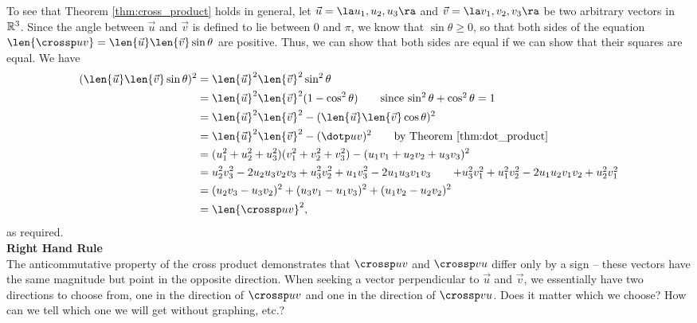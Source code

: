 To see that Theorem \ref{thm:cross_product} holds in general, let $\vec u=\la u_1,u_2,u_3\ra$ and $\vec v =\la v_1,v_2,v_3\ra$ be two arbitrary vectors in $\mathbb{R}^3$. Since the angle between $\vec u$ and $\vec v$ is defined to lie between 0 and $\pi$, we know that $\sin\theta\geq 0$, so that both sides of the equation $\len{\crossp uv} = \len{\vec{u}}\len{\vec v}\sin\theta$ are positive. Thus, we can show that both sides are equal if we can show that their squares are equal. We have
\begin{align*}
(\len{\vec u}\len{\vec v}\sin\theta)^2 & = \len{\vec u}^2\len{\vec v}^2\sin^2\theta\\
& = \len{\vec u}^2\len{\vec v}^2(1-\cos^2\theta) \tag*{since $\sin^2\theta+\cos^2\theta=1$}\\
& = \len{\vec u}^2\len{\vec v}^2-(\len{\vec u}\len{\vec v}\cos\theta)^2\\
& = \len{\vec u}^2\len{\vec v}^2-(\dotp uv)^2 \tag*{by Theorem \ref{thm:dot_product}}\\
& = (u_1^2+u_2^2+u_3^2)(v_1^2+v_2^2+v_3^2)-(u_1v_1+u_2v_2+u_3v_3)^2\\
& = u_2^2v_3^2 - 2u_2u_3v_2v_3 + u_3^2v_2^2 + u_1v_3^2 - 2u_1u_3v_1v_3 \tag*{$+ u_3^2v_1^2 + u_1^2v_2^2 - 2u_1u_2v_1v_2 + u_2^2v_1^2$}\\
& = (u_2v_3-u_3v_2)^2+(u_3v_1-u_1v_3)^2+(u_1v_2-u_2v_2)^2\\
& = \len{\crossp uv}^2,
\end{align*}
as required.\\




\noindent\textbf{Right Hand Rule}\\

The anticommutative property of the cross product demonstrates that $\crossp uv$ and $\crossp vu$ differ only by a sign -- these vectors have the same magnitude but point in the opposite direction. When seeking a vector perpendicular to $\vec u$ and $\vec v$, we essentially have two directions to choose from, one in the direction of $\crossp uv$ and one in the direction of $\crossp vu$. Does it matter which we choose? How can we tell which one we will get without graphing, etc.?

